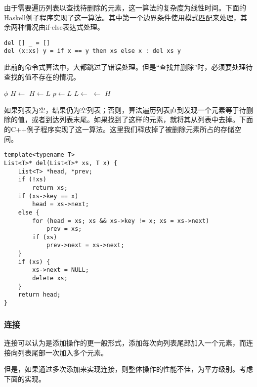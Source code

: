 \documentclass[UTF8]{article}
\begin{document}
由于需要遍历列表以查找待删除的元素，这一算法的复杂度为线性时间。下面的Haskell例子程序实现了这一算法。其中第一个边界条件使用模式匹配来处理，其余两种情况由if-else表达式处理。

\lstset{language=Haskell}
\begin{lstlisting}[style=Haskell]
del [] _ = []
del (x:xs) y = if x == y then xs else x : del xs y
\end{lstlisting}

此前的命令式算法中，大都跳过了错误处理。但是“查找并删除”时，必须要处理待查找的值不存在的情况。

\begin{algorithmic}[1]
   
    \State \Return $\phi$
  \EndIf
    \State $H \gets$ 
  \Else
    \State $H \gets L$
     
      \State $p \gets L$
      \State $L \gets$ 
    \EndWhile
     
      \State {} $\gets$ 
    \EndIf
  \EndIf
  \State \Return $H$
\EndFunction
\end{algorithmic}

如果列表为空，结果仍为空列表；否则，算法遍历列表直到发现一个元素等于待删除的值，或者到达列表末尾。如果找到了这样的元素，就将其从列表中去掉。下面的C++例子程序实现了这一算法。这里我们释放掉了被删除元素所占的存储空间。

\lstset{language=C++}
\begin{lstlisting}
template<typename T>
List<T>* del(List<T>* xs, T x) {
    List<T> *head, *prev;
    if (!xs)
        return xs;
    if (xs->key == x)
        head = xs->next;
    else {
        for (head = xs; xs && xs->key != x; xs = xs->next)
            prev = xs;
        if (xs)
            prev->next = xs->next;
    }
    if (xs) {
        xs->next = NULL;
        delete xs;
    }
    return head;
}
\end{lstlisting}

\subsubsection{连接}
\label{concat}

连接可以认为是添加操作的更一般形式，添加每次向列表尾部加入一个元素，而连接向列表尾部一次加入多个元素。

但是，如果通过多次添加来实现连接，则整体操作的性能不佳，为平方级别。考虑下面的实现。
\end{document}
